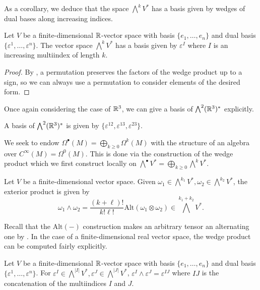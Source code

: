 As a corollary, we deduce that the space $\bigwedge^{k}V^{*}$ has a basis given by wedges of dual bases along increasing indices. 
\begin{lemma}\label{lem: basis by increasing}
    Let $V$ be a finite-dimensional $\mathbb{R}$-vector space with basis $\{e_{1},\dots,e_{n}\}$ and dual basis $\{\varepsilon^{1},\dots,\varepsilon^{n}\}$. The vector space $\bigwedge^{k}V^{*}$ has a basis given by $\varepsilon^{I}$ where $I$ is an increasing multiindex of length $k$. 
\end{lemma}
\begin{proof}
    By , a permutation preserves the factors of the wedge product up to a sign, so we can always use a permutation to consider elements of the desired form. 
\end{proof}
Once again considering the case of $\mathbb{R}^{3}$, we can give a basis of $\bigwedge^{2}(\mathbb{R}^{3})^{*}$ explicitly. 
\begin{example}
    A basis of $\bigwedge^{2}(\mathbb{R}^{3})^{*}$ is given by $\{\varepsilon^{12},\varepsilon^{13},\varepsilon^{23}\}$. 
\end{example}
We seek to endow $\Omega^{\bullet}(M)=\bigoplus_{k\geq0}\Omega^{k}(M)$ with the structure of an algebra over $C^{\infty}(M)=\Omega^{0}(M)$. This is done via the construction of the wedge product which we first construct locally on $\bigwedge^{\bullet}V^{*}=\bigoplus_{k\geq0}\bigwedge^{k}V^{*}$.  
\begin{definition}\label{def: exterior product}
    Let $V$ be a finite-dimensional vector space. Given $\omega_{1}\in\bigwedge^{k_{1}}V^{*},\omega_{2}\in\bigwedge^{k_{2}}V^{*}$, the exterior product is given by 
    $$\omega_{1}\wedge\omega_{2}=\frac{(k+\ell)!}{k!\ell!}\mathrm{Alt}(\omega_{1}\otimes\omega_{2})\in\bigwedge^{k_{1}+k_{2}}V^{*}.$$
\end{definition}
Recall that the $\mathrm{Alt}(-)$ construction makes an arbitrary tensor an alternating one by .
In the case of a finite-dimensional real vector space, the wedge product can be computed fairly explicitly. 
\begin{lemma}\label{lem: exterior product as concatenation}
    Let $V$ be a finite-dimensional $\mathbb{R}$-vector space with basis $\{e_{1},\dots,e_{n}\}$ and dual basis $\{\varepsilon^{1},\dots,\varepsilon^{n}\}$. For $\varepsilon^{I}\in\bigwedge^{|I|}V^{*},\varepsilon^{J}\in\bigwedge^{|J|}V^{*}$, $\varepsilon^{I}\wedge\varepsilon^{J}=\varepsilon^{IJ}$ where $IJ$ is the concatenation of the multiindices $I$ and $J$. 
\end{lemma}
